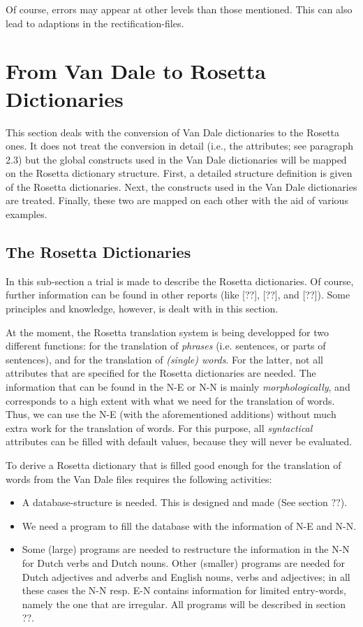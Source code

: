 Of course, errors may appear at other levels than those mentioned. This can 
also lead to adaptions in the rectification-files.

\newpage
\section{From Van Dale to Rosetta Dictionaries}

This section deals with the conversion of Van Dale dictionaries to the Rosetta
ones. It does not treat the conversion in detail (i.e., the attributes; see 
paragraph 2.3) but the global constructs used in the Van Dale dictionaries will 
be mapped on the Rosetta dictionary structure. First, a detailed structure 
definition is given of the Rosetta dictionaries. Next, the constructs used in 
the Van Dale dictionaries are treated. Finally, these two are mapped on each 
other with the aid of various examples.

\subsection{The Rosetta Dictionaries}

In this sub-section a trial is made to describe the Rosetta dictionaries. Of 
course, further information can be found in other reports (like [??], [??], and
[??]). Some principles and knowledge, however, is dealt with in this section. 

At the moment, the Rosetta translation system is being developped for two 
different functions: for the translation of {\em phrases}
(i.e. sentences, or parts of sentences), and for the translation of
{\em (single) words}. For the latter, not all attributes that are
specified for the Rosetta dictionaries are needed.
The information that can be found in the N-E or N-N is mainly 
{\em morphologically}, and 
corresponds to a high extent with what we need for the translation of words.
Thus, we can use the N-E (with the aforementioned additions) without much extra
work for the translation of words. For this purpose, all {\em syntactical} 
attributes can be filled with default values, because they will never be
evaluated.

To derive a Rosetta dictionary that is filled good enough for the translation 
of words from the Van Dale files requires the following activities:
\begin{itemize}
  \item A database-structure is needed. This is designed and made (See section
        ??). 
  \item We need a program to fill the database with the information of 
        N-E and N-N.
  \item Some (large) programs are needed to restructure the information
        in the N-N for Dutch verbs and Dutch nouns. 
        Other (smaller) programs 
        are needed for Dutch adjectives and adverbs and English nouns, 
        verbs and adjectives; in all these cases the N-N resp. E-N contains
        information for limited entry-words, namely the one that are irregular.
        All programs will be described in section ??.
\end{itemize}

